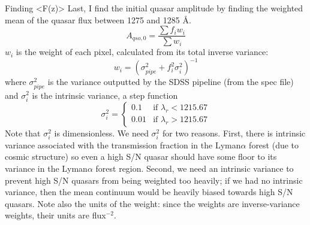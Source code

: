 \documentclass[12pt]{aastex}
\begin{document}
\begin{section}{Finding <F(z)>}
Last, I find the initial quasar amplitude by finding the weighted mean of the quasar flux between 1275 and 1285 \AA.
\begin{equation}
A_{qso,0} = \frac{\sum f_i w_i}{\sum w_i}
\label{eqn:a0}
\end{equation}
$w_i$ is the weight of each pixel, calculated from its total inverse variance:
\begin{equation}
w_i = \left(\sigma_{pipe}^2 + f_i^2 \sigma_{i}^2\right)^{-1}
\label{eqn:wt_for_a0}
\end{equation}
where $\sigma_{pipe}^2$ is the variance outputted by the SDSS pipeline (from the spec file) and $\sigma_{i}^2$ is the intrinsic variance,
a step function
\begin{equation}
\sigma_i^2 = 
\begin{cases}
0.1 & \text{if } \lambda_r < 1215.67 \\
0.01 & \text{if } \lambda_r > 1215.67
\end{cases}
\end{equation}
Note that $\sigma_i^2$ is dimensionless.  We need $\sigma_{i}^2$ for two reasons.
First, there is intrinsic variance associated with the transmission fraction in the Lyman$\alpha$ forest (due to cosmic structure)
so even a high S/N quasar should have some floor to its variance in the Lyman$\alpha$ forest region.
Second, we need an intrinsic variance to prevent high S/N quasars from being weighted too heavily; if we had no intrinsic variance,
then the mean continuum would be heavily biased towards high S/N quasars.  Note also the units of the weight: since the weights are inverse-variance
weights, their units are flux$^{-2}$.



\end{section}
\end{document}
